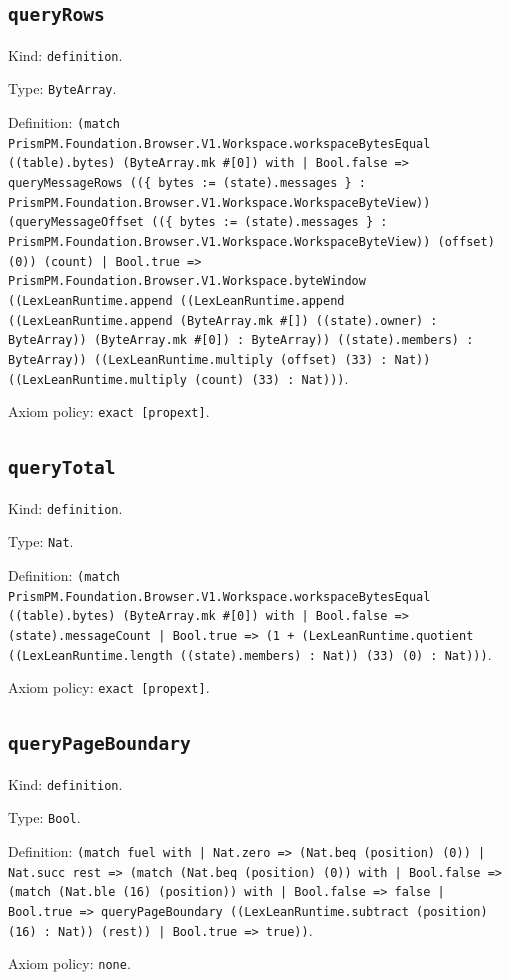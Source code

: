 \documentclass[11pt]{article}
\begin{document}
\subsection*{\texttt{queryRows}}
\noindent Kind: \texttt{definition}.\par
\noindent Type: \texttt{ByteArray}.\par
\noindent Definition: \texttt{(match PrismPM.Foundation.Browser.V1.Workspace.workspaceBytesEqual ((table).bytes) (ByteArray.mk \#[0]) with | Bool.false => queryMessageRows ((\{ bytes := (state).messages \} : PrismPM.Foundation.Browser.V1.Workspace.WorkspaceByteView)) (queryMessageOffset ((\{ bytes := (state).messages \} : PrismPM.Foundation.Browser.V1.Workspace.WorkspaceByteView)) (offset) (0)) (count) | Bool.true => PrismPM.Foundation.Browser.V1.Workspace.byteWindow ((LexLeanRuntime.append ((LexLeanRuntime.append ((LexLeanRuntime.append (ByteArray.mk \#[]) ((state).owner) : ByteArray)) (ByteArray.mk \#[0]) : ByteArray)) ((state).members) : ByteArray)) ((LexLeanRuntime.multiply (offset) (33) : Nat)) ((LexLeanRuntime.multiply (count) (33) : Nat)))}.\par
\noindent Axiom policy: \texttt{exact [propext]}.\par
\subsection*{\texttt{queryTotal}}
\noindent Kind: \texttt{definition}.\par
\noindent Type: \texttt{Nat}.\par
\noindent Definition: \texttt{(match PrismPM.Foundation.Browser.V1.Workspace.workspaceBytesEqual ((table).bytes) (ByteArray.mk \#[0]) with | Bool.false => (state).messageCount | Bool.true => (1 + (LexLeanRuntime.quotient ((LexLeanRuntime.length ((state).members) : Nat)) (33) (0) : Nat)))}.\par
\noindent Axiom policy: \texttt{exact [propext]}.\par
\subsection*{\texttt{queryPageBoundary}}
\noindent Kind: \texttt{definition}.\par
\noindent Type: \texttt{Bool}.\par
\noindent Definition: \texttt{(match fuel with | Nat.zero => (Nat.beq (position) (0)) | Nat.succ rest => (match (Nat.beq (position) (0)) with | Bool.false => (match (Nat.ble (16) (position)) with | Bool.false => false | Bool.true => queryPageBoundary ((LexLeanRuntime.subtract (position) (16) : Nat)) (rest)) | Bool.true => true))}.\par
\noindent Axiom policy: \texttt{none}.\par
\end{document}
